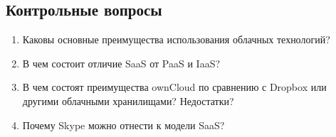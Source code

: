 \subsection{Контрольные вопросы}
\begin{enumerate}
    \item Каковы основные преимущества использования облачных технологий?
    \item В чем состоит отличие SaaS от PaaS и IaaS?
    \item В чем состоят преимущества ownCloud по сравнению с Dropbox или другими облачными хранилищами? Недостатки?
    \item Почему Skype можно отнести к модели SaaS?
\end{enumerate}

\clearpage
